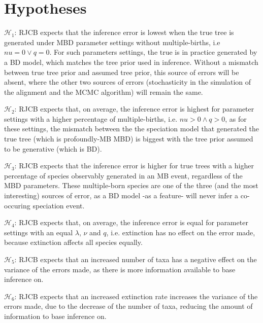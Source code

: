\section{Hypotheses}

$\mathcal{H}_1$: RJCB expects that the inference error is lowest when the true
tree is generated under MBD parameter settings without multiple-births, i.e
$nu = 0 \vee q = 0$. For such parameters settings, the
true is in practice generated by a BD model, which
matches the tree prior used in inference. Without a mismatch between
true tree prior and assumed tree prior, this source of errors will be absent,
where the other two sources of errors (stochasticity in the
simulation of the alignment and the MCMC algorithm) 
will remain the same. 

$\mathcal{H}_2$: RJCB expects that, on average, the inference error is highest for
parameter settings with a higher percentage of multiple-births,
i.e. $nu > 0 \wedge q > 0$, as for these settings, 
the mismatch between the the speciation model that
generated the true tree (which is profoundly-MB MBD) is biggest with
the tree prior assumed to be generative (which is BD). 

$\mathcal{H}_3$: RJCB expects that the inference error is higher for true trees
with a higher percentage of species observably generated in an MB event,
regardless of the MBD parameters.
These multiple-born species are one of the three (and the most 
interesting) sources of error, as a BD model -as a feature- will never
infer a co-occuring speciation event. 

$\mathcal{H}_4$: RJCB expects that, on average, the inference error is equal for
parameter settings with an equal $\lambda$, $\nu$ and $q$, i.e. extinction
has no effect on the error made, because extinction affects all species equally. 

$\mathcal{H}_5$: RJCB expects that an increased number of taxa
has a negative effect on the variance of the errors made, as there
is more information available to base inference on.

$\mathcal{H}_6$: RJCB expects that an increased extinction rate
increases the variance of the errors made,
due to the decrease of the number of taxa, reducing the amount of information
to base inference on.

